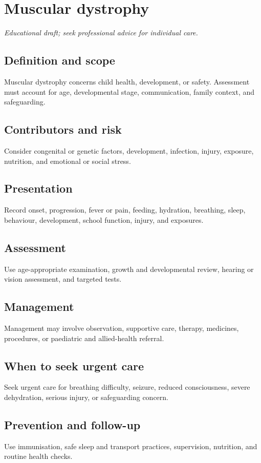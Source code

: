 \chapter{Muscular dystrophy}

\medskip
\noindent\textit{Educational draft; seek professional advice for individual care.}

\section*{Definition and scope}
Muscular dystrophy concerns child health, development, or safety. Assessment must account for age, developmental stage, communication, family context, and safeguarding.

\section*{Contributors and risk}
Consider congenital or genetic factors, development, infection, injury, exposure, nutrition, and emotional or social stress.

\section*{Presentation}
Record onset, progression, fever or pain, feeding, hydration, breathing, sleep, behaviour, development, school function, injury, and exposures.

\section*{Assessment}
Use age-appropriate examination, growth and developmental review, hearing or vision assessment, and targeted tests.

\section*{Management}
Management may involve observation, supportive care, therapy, medicines, procedures, or paediatric and allied-health referral.

\section*{When to seek urgent care}
Seek urgent care for breathing difficulty, seizure, reduced consciousness, severe dehydration, serious injury, or safeguarding concern.

\section*{Prevention and follow-up}
Use immunisation, safe sleep and transport practices, supervision, nutrition, and routine health checks.

